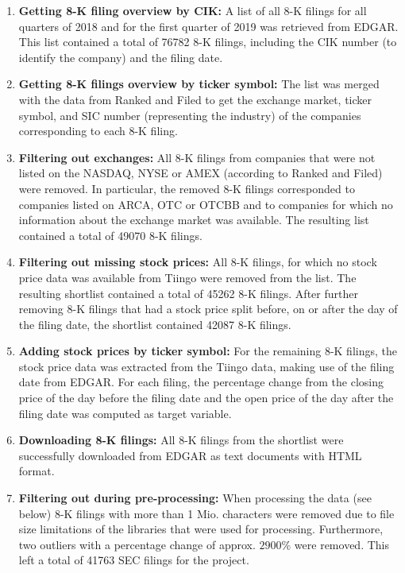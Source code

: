 \documentclass{article}
\begin{document}
	\begin{enumerate}
		\item \textbf{Getting 8-K filing overview by CIK:} A list of all 8-K filings for all quarters of 2018 and for the first quarter of 2019 was retrieved from EDGAR. This list contained a total of 76782 8-K filings, including the CIK number (to identify the company) and the filing date.
		\item \textbf{Getting 8-K filings overview by ticker symbol:} The list was merged with the data from Ranked and Filed to get the exchange market, ticker symbol, and SIC number (representing the industry) of the companies corresponding to each 8-K filing.
		\item \textbf{Filtering out exchanges:} All  8-K filings from companies that were not listed on the NASDAQ, NYSE or AMEX (according to Ranked and Filed) were removed. In particular, the removed 8-K filings corresponded to companies listed on ARCA, OTC or OTCBB and to companies for which no information about the exchange market was available. The resulting list contained a total of 49070 8-K filings.
		\item \textbf{Filtering out missing stock prices:} All 8-K filings, for which no stock price data was available from Tiingo were removed from the list. The resulting shortlist contained a total of 45262 8-K filings. After further removing 8-K filings that had a stock price split before, on or after the day of the filing date, the shortlist contained 42087  8-K filings.
		\item \textbf{Adding stock prices by ticker symbol:} For the remaining 8-K filings, the stock price data was extracted from the Tiingo data, making use of the filing date from EDGAR. For each filing, the percentage change from the closing price of the day before the filing date and the open price of the day after the filing date was computed as target variable.
		\item \textbf{Downloading 8-K filings:} All 8-K filings from the shortlist were successfully downloaded from EDGAR as text documents with HTML format.
		\item \textbf{Filtering out during pre-processing:} When processing the data (see below) 8-K filings with more than 1 Mio. characters were removed due to file size limitations of the libraries that were used for processing. Furthermore, two outliers with a percentage change of approx. $2900$\% were removed. This left a total of 41763 SEC filings for the project.

		
	\end{enumerate}
	
\end{document}
